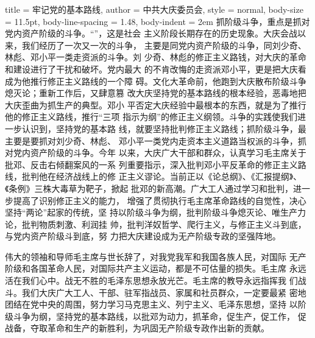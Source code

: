 \begin{hongqiarticle}{
        title  = {牢记党的基本路线},
        author = {中共大庆委员会},
        style  = normal,
        body-size = 11.5pt,
        body-line-spacing = 1.48,
        body-indent = 2em
    }
    抓阶级斗争，重点是抓对党内资产阶级的斗争。“”，这是社会
    主义阶段长期存在的历史现象。大庆会战以来，我们经历了一次又一次的斗争，
    主要是同党内资产阶级的斗争，同刘少奇、林彪、邓小平一类走资派的斗争。刘
    少奇、林彪的修正主义路钱，对大庆的革命和建设进行了干扰和破坏。党内最大
    的不肯改悔的走资派邓小平，更是把大庆看成为他推行修正主义路线的一个障
    碍。文化大革命前，他跑到大庆散布阶级斗争熄灭论；重新工作后，又肆意篡
    改大庆坚持党的基本路线的根本经验，恶毒地把大庆歪曲为抓生产的典型。邓小
    平否定大庆经验中最根本的东西，就是为了推行他的修正主义路线，推行“三项
    指示为纲”的修正主义纲领。斗争的实践使我们进一步认识到，坚持党的基本路
    线，就要坚持批判修正主义路线；抓阶级斗争，最主要是要抓对刘少奇、林彪、
    邓小平一类党内走资本主义道路当权派的斗争，抓对党内资产阶级的斗争。今年
    以来，大庆广大干部和群众，认真学习毛主席关于批邓、反击右倾翻案风的一系
    列重要指示，深入批判邓小平反革命的修正主义路线，批判他在经济战线上的修
    正主义谬论。当前正以《论总纲》、《汇报提纲》、《条例》三株大毒草为靶子，掀起
    批邓的新高潮。广大工人通过学习和批判，进一步提高了识别修正主义的能力，
    增强了贯彻执行毛主席革命路线的自觉性，决心坚持“两论”起家的传统，坚
    持以阶级斗争为纲，批判阶级斗争熄灭论、唯生产力论，批判物质刺激、利润挂
    帅，批判洋奴哲学、爬行主义，与修正主义斗到底，与党内资产阶级斗到底，努
    力把大庆建设成为无产阶级专政的坚强阵地。
    
    伟大的领袖和导师毛主席与世长辞了，对我党我军和我国各族人民，对国际
    无产阶级和各国革命人民，对国际共产主义运动，都是不可估量的损失。毛主席
    永远活在我们心中。战无不胜的毛泽东思想永放光芒。毛主席的教导永远指挥我
    们战斗。我们大庆广大工人、干部、驻军指战员、家属和社员群众，一定要最紧
    密地团结在党中央的周围，努力学习马克思主义、列宁主义、毛泽东思想，坚持
    以阶级斗争为纲，坚持党的基本路线，以批邓为动力，抓革命，促生产，促工作，
    促战备，夺取革命和生产的新胜利，为巩固无产阶级专政作出新的贡献。
\end{hongqiarticle}
